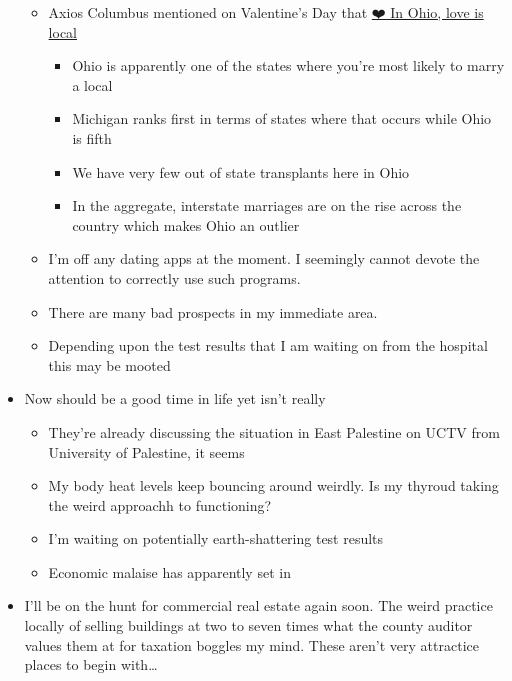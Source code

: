 \begin{itemize}
  \begin{itemize}
  \tightlist
  \item
    Axios Columbus mentioned on Valentine's Day that
    \href{https://www.axios.com/newsletters/axios-columbus-98c5a5a0-266a-4193-a96f-10630166e816.html?chunk=1&utm_term=emshare\#story1}{❤️
    In Ohio, love is local}

    \begin{itemize}
    \tightlist
    \item
      Ohio is apparently one of the states where you're most likely to
      marry a local
    \item
      Michigan ranks first in terms of states where that occurs while
      Ohio is fifth
    \item
      We have very few out of state transplants here in Ohio
    \item
      In the aggregate, interstate marriages are on the rise across the
      country which makes Ohio an outlier
    \end{itemize}
  \item
    I'm off any dating apps at the moment. I seemingly cannot devote the
    attention to correctly use such programs.
  \item
    There are many bad prospects in my immediate area.
  \item
    Depending upon the test results that I am waiting on from the
    hospital this may be mooted
  \end{itemize}
\item
  Now should be a good time in life yet isn't really

  \begin{itemize}
  \tightlist
  \item
    They're already discussing the situation in East Palestine on UCTV
    from University of Palestine, it seems
  \item
    My body heat levels keep bouncing around weirdly. Is my thyroud
    taking the weird approachh to functioning?
  \item
    I'm waiting on potentially earth-shattering test results
  \item
    Economic malaise has apparently set in
  \end{itemize}
\item
  I'll be on the hunt for commercial real estate again soon. The weird
  practice locally of selling buildings at two to seven times what the
  county auditor values them at for taxation boggles my mind. These
  aren't very attractice places to begin with\ldots{}
\end{itemize}
